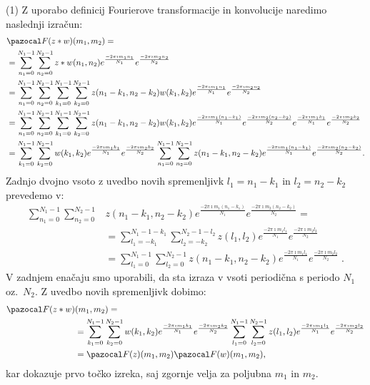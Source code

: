 %
\begin{dokaz} (1) Z uporabo definicij Fourierove transformacije in konvolucije naredimo naslednji izračun:
%
\begin{align*}
&\F(z \ast w)(m_1, m_2) = \\
& = \sum_{n_1 = 0}^{N_1 - 1} \sum_{n_2 = 0}^{N_2 - 1} z \ast w(n_1, n_2) e^{\frac{-2\pi \imath m_1n_1}{N_1}} e^{\frac{-2\pi \imath m_2n_2}{N_2}} \\
& = \sum_{n_1 = 0}^{N_1 - 1} \sum_{n_2 = 0}^{N_2 - 1} \sum_{k_1 = 0}^{N_1 - 1} \sum_{k_2 = 0}^{N_2 - 1} z(n_1 - k_1, n_2 - k_2) w(k_1, k_2) e^{\frac{-2\pi \imath m_1n_1}{N_1}} e^{\frac{-2\pi \imath m_2n_2}{N_2}} \\
& = \sum_{n_1 = 0}^{N_1 - 1} \sum_{n_2 = 0}^{N_2 - 1} \sum_{k_1 = 0}^{N_1 - 1} \sum_{k_2 = 0}^{N_2 - 1} z(n_1 - k_1, n_2 - k_2) w(k_1, k_2) e^{\frac{-2\pi \imath m_1(n_1-k_1)}{N_1}} e^{\frac{-2\pi \imath m_2(n_2-k_2)}{N_2}} e^{\frac{-2\pi \imath m_1k_1}{N_1}} e^{\frac{-2\pi \imath m_2k_2}{N_2}} \\
& = \sum_{k_1 = 0}^{N_1 - 1} \sum_{k_2 = 0}^{N_2 - 1} w(k_1, k_2) e^{\frac{-2\pi \imath m_1k_1}{N_1}} e^{\frac{-2\pi \imath m_2k_2}{N_2}} \sum_{n_1 = 0}^{N_1 - 1} \sum_{n_2 = 0}^{N_2 - 1} z(n_1 - k_1, n_2 - k_2) e^{\frac{-2\pi \imath m_1(n_1-k_1)}{N_1}} e^{\frac{-2\pi \imath m_2(n_2-k_2)}{N_2}}.
\end{align*}
%
Zadnjo dvojno vsoto z uvedbo novih spremenljivk $l_1 = n_1 - k_1$ in $l_2 = n_2 - k_2$ prevedemo v:
%
\begin{align*}
\sum_{n_1 = 0}^{N_1 - 1} \sum_{n_2 = 0}^{N_2 - 1} & z(n_1 - k_1, n_2 - k_2) e^{\frac{-2\pi \imath m_1(n_1-k_1)}{N_1}} e^{\frac{-2\pi \imath m_2(n_2-k_2)}{N_2}} = \\
& = \sum_{l_1 = -k_1}^{N_1 - 1 - k_1} \sum_{l_2 = -k_2}^{N_2 - 1 - l_2} z(l_1, l_2) e^{\frac{-2\pi \imath m_1l_1}{N_1}} e^{\frac{-2\pi \imath m_2l_2}{N_2}} \\
& = \sum_{l_1 = 0}^{N_1 - 1} \sum_{l_2 = 0}^{N_2 - 1} z(n_1 - k_1, n_2 - k_2) e^{\frac{-2\pi \imath m_1l_1}{N_1}} e^{\frac{-2\pi \imath m_2l_2}{N_2}} \;.
\end{align*}
%
V zadnjem enačaju smo uporabili, da sta izraza v vsoti periodična s periodo $N_1$ oz.\ $N_2$. Z uvedbo novih spremenljivk dobimo:
%
\begin{align*}
\F(z \ast w)& (m_1, m_2) = \\
& = \sum_{k_1 = 0}^{N_1 - 1} \sum_{k_2 = 0}^{N_2 - 1} w(k_1, k_2) e^{\frac{-2\pi \imath m_1k_1}{N_1}} e^{\frac{-2\pi \imath m_2k_2}{N_2}} \sum_{l_1 = 0}^{N_1 - 1} \sum_{l_2 = 0}^{N_2 - 1} z(l_1, l_2) e^{\frac{-2\pi \imath m_1l_1}{N_1}} e^{\frac{-2\pi \imath m_2l_2}{N_2}} \\
& = \F(z)(m_1, m_2) \F(w)(m_1, m_2),
\end{align*}
%
kar dokazuje prvo točko izreka, saj zgornje velja za poljubna $m_1$ in $m_2$.


\end{dokaz}
